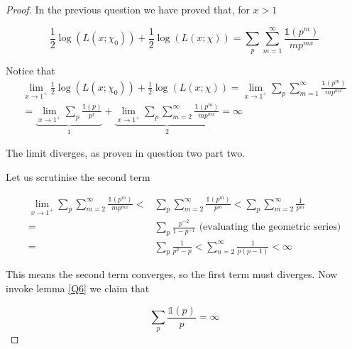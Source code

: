 \documentclass{article}
\theoremstyle{definition}
\theoremstyle{definition}
\theoremstyle{remark}
\begin{document}
\begin{proof}
In the previous question we have proved that,  for $x > 1$

	$$
\frac{1}{2} \log(L(x; \chi_0)) + \frac{1}{2} \log(L(x; \chi)) =
\sum_p \sum _{m=1}^{\infty} \frac{\mathbb{1}(p^m)}{m p^{mx}} 
	$$

Notice that 
\begin{align}
	\lim_{x \rightarrow 1^+} \frac{1}{2} \log(L(x; \chi_0)) + \frac{1}{2} \log(L(x; \chi)) 
	= \lim_{x \rightarrow 1^+}\sum_p \sum _{m=1}^{\infty} \frac{\mathbb{1}(p^m)}{m p^{mx}} \\
	=
	\underbrace{\lim_{x \rightarrow 1^+}\sum_p \frac{\mathbb{1}(p)}{p^x}}_{1} +
	\underbrace{\lim_{x \rightarrow 1^+} \sum_p \sum _{m=2}^{\infty} \frac{\mathbb{1}(p^m)}{m p^{mx}}}_{2} 
	= \infty
\end{align}

The limit diverges, as proven in question two part two.

Let us scrutinise the second term

\begin{align}
 \lim_{x \rightarrow 1^+} \sum_p \sum _{m=2}^{\infty} \frac{\mathbb{1}(p^m)}{m p^{mx}} 
<&  \sum_p \sum _{m=2}^{\infty} \frac{\mathbb{1}(p^m)}{p^{m}} 
<  \sum_p \sum _{m=2}^{\infty} \frac{1}{p^{m}} 
\\  
=&  \sum_p \frac{p^{-2}}{1-p^{-1}} \text{ (evaluating the geometric series)}\\ 
=&  \sum_p \frac{1}{p^2-p} 
<  \sum_{n = 2}^{\infty} \frac{1}{p(p-1)} < \infty
\end{align}

This means the second term converges, so the first term must diverges. 
Now invoke lemma \ref{Q6} we claim that 

$$
	\sum_p \frac{\mathbb{1}(p)}{p} = \infty
$$

\end{proof}
\end{document}
